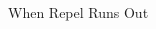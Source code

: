 \begin{paracol}{2}
\switchcolumn
\begin{menu}{When Repel Runs Out}
	\varwb
	\begin{packMenu}
		\item \menuHlTwo{(\pointLeft{})}  \headbutt{} \switch{} \leer{} 
		\begin{notes}
			\item {}
		\end{notes}
		\item \repel
	\end{packMenu}
	\varwe
\end{menu}

\end{paracol}
\vspace{3.5mm}